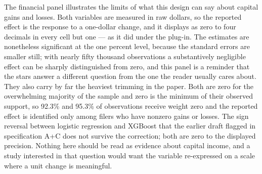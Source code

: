 \documentclass[12pt,a4paper]{article}
\numberwithin{equation}{section}
\theoremstyle{plain}
\theoremstyle{definition}
\begin{document}
	The financial panel illustrates the limits of what this design can say about capital gains and losses. Both variables are measured in raw dollars, so the reported effect is the response to a one-dollar change, and it displays as zero to four decimals in every cell but one --- as it did under the plug-in. The estimates are nonetheless significant at the one percent level, because the standard errors are smaller still; with nearly fifty thousand observations a substantively negligible effect can be sharply distinguished from zero, and this panel is a reminder that the stars answer a different question from the one the reader usually cares about. They also carry by far the heaviest trimming in the paper. Both are zero for the overwhelming majority of the sample and zero is the minimum of their observed support, so 92.3\% and 95.3\% of observations receive weight zero and the reported effect is identified only among filers who have nonzero gains or losses. The sign reversal between logistic regression and XGBoost that the earlier draft flagged in specification A+C does not survive the correction; both are zero to the displayed precision. Nothing here should be read as evidence about capital income, and a study interested in that question would want the variable re-expressed on a scale where a unit change is meaningful.
	
\end{document}
